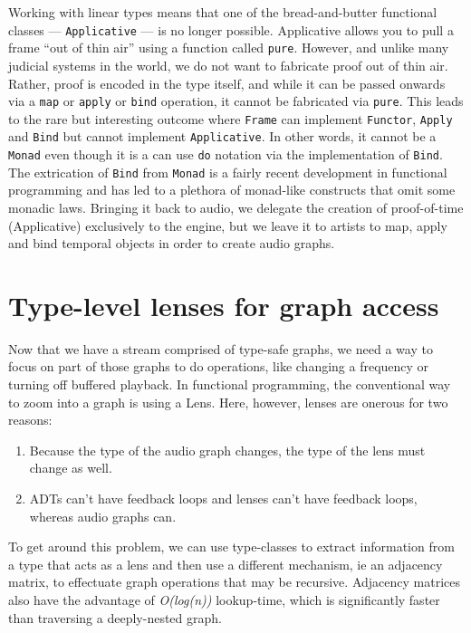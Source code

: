 \documentclass{sig-alternate}
\begin{document}
\begin{sloppypar}
  Working with linear types means that one of the bread-and-butter functional classes --- \texttt{Applicative} --- is no longer possible. Applicative allows you to pull a frame ``out of thin air'' using a function called \texttt{pure}.  However, and unlike many judicial systems in the world, we do not want to fabricate proof out of thin air. Rather, proof is encoded in the type itself, and while it can be passed onwards via a \texttt{map} or \texttt{apply} or \texttt{bind} operation, it cannot be fabricated via \texttt{pure}. This leads to the rare but interesting outcome where \texttt{Frame} can implement \verb=Functor=, \verb=Apply= and \verb=Bind= but cannot implement \verb=Applicative=. In other words, it cannot be a \verb=Monad= even though it is a can use \texttt{do} notation via the implementation of \verb=Bind=. The extrication of \texttt{Bind} from \texttt{Monad} is a fairly recent development in functional programming and has led to a plethora of monad-like constructs that omit some monadic laws. Bringing it back to audio, we delegate the creation of proof-of-time (Applicative) exclusively to the engine, but we leave it to artists to map, apply and bind temporal objects in order to create audio graphs.

  \section{Type-level lenses for graph access}

  Now that we have a stream comprised of type-safe graphs, we need a way to focus on part of those graphs to do operations, like changing a frequency or turning off buffered playback.  In functional programming, the conventional way to zoom into a graph is using a Lens. Here, however, lenses are onerous for two reasons:

  \begin{enumerate}
    \item Because the type of the audio graph changes, the type of the lens must change as well.
    \item ADTs can't have feedback loops and lenses can't have feedback loops, whereas audio graphs can.
  \end{enumerate}

  To get around this problem, we can use type-classes to extract information from a type that acts as a lens and then use a different mechanism, ie an adjacency matrix, to effectuate graph operations that may be recursive. Adjacency matrices also have the advantage of \textit{O(log(n))} lookup-time, which is significantly faster than traversing a deeply-nested graph.


\end{sloppypar}
\end{document}
